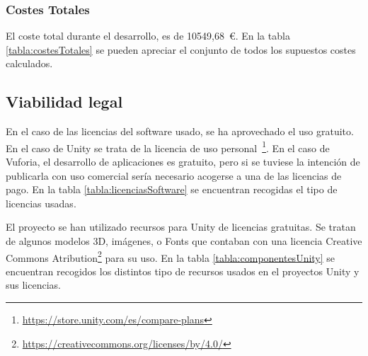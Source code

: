 
\subsubsection{Costes Totales}

	El coste total durante el desarrollo, es de 10549,68~\euro. En la tabla \ref{tabla:costesTotales} se pueden apreciar el conjunto de todos los supuestos costes calculados.
	

\subsection{Viabilidad legal}

En el caso de las licencias del software usado, se ha aprovechado el uso gratuito. En el caso de Unity se trata de la licencia de uso personal~\footnote{\url{https://store.unity.com/es/compare-plans}}. En el caso de Vuforia, el desarrollo de aplicaciones es gratuito, pero si se tuviese la intención de publicarla con uso comercial sería necesario acogerse a una de las licencias de pago. En la tabla \ref{tabla:licenciasSoftware} se encuentran recogidas el tipo de licencias usadas.

El proyecto se han utilizado recursos para Unity de licencias gratuitas. Se tratan de algunos modelos 3D, imágenes, o Fonts que contaban con una licencia Creative Commons Atribution\footnote{\url{https://creativecommons.org/licenses/by/4.0/}} para su uso. En la tabla \ref{tabla:componentesUnity} se encuentran recogidos los distintos tipo de recursos usados en el proyectos Unity y sus licencias.


